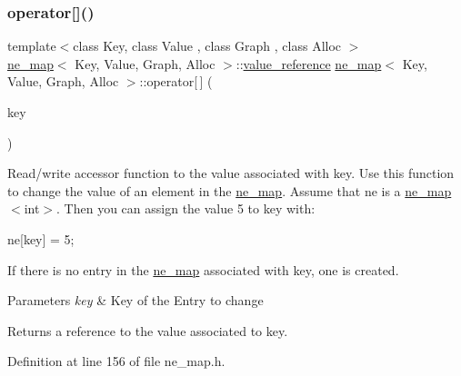 \subsubsection{\texorpdfstring{operator[]()}{operator[]()}\hspace{0.1cm}{\footnotesize\ttfamily [1/2]}}
{\footnotesize\ttfamily template$<$class Key, class Value , class Graph , class Alloc $>$ \\
\mbox{\hyperlink{classne__map}{ne\+\_\+map}}$<$ Key, Value, Graph, Alloc $>$\+::\mbox{\hyperlink{classne__map_a3de60750d102f8992a215b0fe645014d}{value\+\_\+reference}} \mbox{\hyperlink{classne__map}{ne\+\_\+map}}$<$ Key, Value, Graph, Alloc $>$\+::operator\mbox{[}$\,$\mbox{]} (\begin{DoxyParamCaption}\item[{Key}]{key }\end{DoxyParamCaption})}

Read/write accessor function to the value associated with {\ttfamily key}. Use this function to change the value of an element in the {\ttfamily \mbox{\hyperlink{classne__map}{ne\+\_\+map}}}. Assume that {\ttfamily ne} is a {\ttfamily \mbox{\hyperlink{classne__map}{ne\+\_\+map}}$<$int$>$}. Then you can assign the value 5 to {\ttfamily key} with\+: 
\begin{DoxyPre}
  ne[key] = 5;
\end{DoxyPre}


If there is no entry in the {\ttfamily \mbox{\hyperlink{classne__map}{ne\+\_\+map}}} associated with {\ttfamily key}, one is created.


\begin{DoxyParams}{Parameters}
{\em key} & Key of the Entry to change \\
\hline
\end{DoxyParams}
\begin{DoxyReturn}{Returns}
a reference to the value associated to {\ttfamily key}. 
\end{DoxyReturn}


Definition at line 156 of file ne\+\_\+map.\+h.


